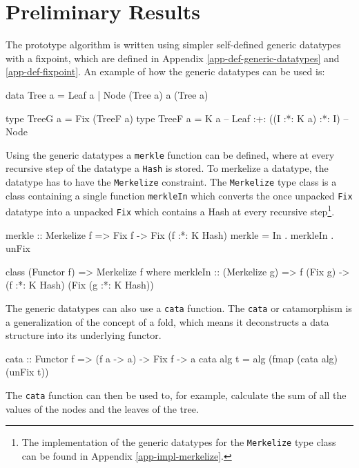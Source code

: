 \section{Preliminary Results}
The prototype algorithm is written using simpler self-defined generic datatypes with a fixpoint, which are defined in Appendix \ref{app-def-generic-datatypes} and \ref{app-def-fixpoint}. An example of how the generic datatypes can be used is:
\begin{haskell}
data Tree a = Leaf a
            | Node (Tree a) a (Tree a)

type TreeG a = Fix (TreeF a)
type TreeF a = K a                  -- Leaf
            :+: ((I :*: K a) :*: I) -- Node
\end{haskell}

Using the generic datatypes a \texttt{merkle} function can be defined, where at every recursive step of the datatype a \texttt{Hash} is stored. To merkelize a datatype, the datatype has to have the \texttt{Merkelize} constraint. The \texttt{Merkelize} type class is a class containing a single function \texttt{merkleIn} which converts the once unpacked \texttt{Fix} datatype into a unpacked \texttt{Fix} which contains a Hash at every recursive step\footnote{The implementation of the generic datatypes for the \texttt{Merkelize} type class can be found in Appendix \ref{app-impl-merkelize}.}.

\begin{haskell}
merkle :: Merkelize f => Fix f -> Fix (f :*: K Hash)
merkle = In . merkleIn . unFix
\end{haskell}
\begin{haskell}
class (Functor f) => Merkelize f where
  merkleIn :: (Merkelize g) 
           => f (Fix g) -> (f :*: K Hash) (Fix (g :*: K Hash))
\end{haskell}

The generic datatypes can also use a \texttt{cata} function. The \texttt{cata} or catamorphism is a generalization of the concept of a fold, which means it deconstructs a data structure into its underlying functor\cite{HaskellWikiCatamorphism}.

\begin{haskell}
cata :: Functor f => (f a -> a) -> Fix f -> a
cata alg t = alg (fmap (cata alg) (unFix t)) 
\end{haskell}

The \texttt{cata} function can then be used to, for example, calculate the sum of all the values of the nodes and the leaves of the tree.

